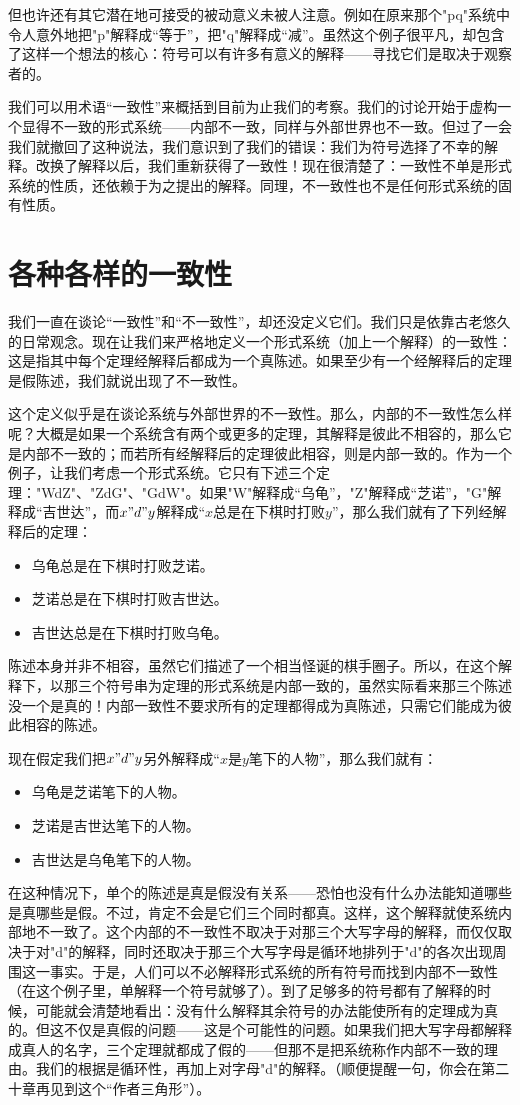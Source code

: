 但也许还有其它潜在地可接受的被动意义未被人注意。例如在原来那个"pq"系统中令人意外地把"p"解释成“等于”，把"q"解释成“减”。虽然这个例子很平凡，却包含了这样一个想法的核心：符号可以有许多有意义的解释——寻找它们是取决于观察者的。

我们可以用术语“一致性”来概括到目前为止我们的考察。我们的讨论开始于虚构一个显得不一致的形式系统——内部不一致，同样与外部世界也不一致。但过了一会我们就撤回了这种说法，我们意识到了我们的错误：我们为符号选择了不幸的解释。改换了解释以后，我们重新获得了一致性！现在很清楚了：一致性不单是形式系统的性质，还依赖于为之提出的解释。同理，不一致性也不是任何形式系统的固有性质。

\section{各种各样的一致性}

我们一直在谈论“一致性”和“不一致性”，却还没定义它们。我们只是依靠古老悠久的日常观念。现在让我们来严格地定义一个形式系统（加上一个解释）的一致性：这是指其中每个定理经解释后都成为一个真陈述。如果至少有一个经解释后的定理是假陈述，我们就说出现了不一致性。

这个定义似乎是在谈论系统与外部世界的不一致性。那么，内部的不一致性怎么样呢？大概是如果一个系统含有两个或更多的定理，其解释是彼此不相容的，那么它是内部不一致的；而若所有经解释后的定理彼此相容，则是内部一致的。作为一个例子，让我们考虑一个形式系统。它只有下述三个定理："WdZ"、"ZdG"、"GdW"。如果"W"解释成“乌龟”，"Z"解释成“芝诺”，"G"解释成“吉世达”，而$x"d"y$解释成“$x$总是在下棋时打败$y$”，那么我们就有了下列经解释后的定理：
\begin{itemize}
\item 乌龟总是在下棋时打败芝诺。
\item 芝诺总是在下棋时打败吉世达。
\item 吉世达总是在下棋时打败乌龟。
\end{itemize}
陈述本身并非不相容，虽然它们描述了一个相当怪诞的棋手圈子。所以，在这个解释下，以那三个符号串为定理的形式系统是内部一致的，虽然实际看来那三个陈述没一个是真的！内部一致性不要求所有的定理都得成为真陈述，只需它们能成为彼此相容的陈述。

现在假定我们把$x"d"y$另外解释成“$x$是$y$笔下的人物”，那么我们就有：
\begin{itemize}
\item 乌龟是芝诺笔下的人物。
\item 芝诺是吉世达笔下的人物。
\item 吉世达是乌龟笔下的人物。
\end{itemize}
在这种情况下，单个的陈述是真是假没有关系——恐怕也没有什么办法能知道哪些是真哪些是假。不过，肯定不会是它们三个同时都真。这样，这个解释就使系统内部地不一致了。这个内部的不一致性不取决于对那三个大写字母的解释，而仅仅取决于对"d"的解释，同时还取决于那三个大写字母是循环地排列于"d"的各次出现周围这一事实。于是，人们可以不必解释形式系统的所有符号而找到内部不一致性（在这个例子里，单解释一个符号就够了）。到了足够多的符号都有了解释的时候，可能就会清楚地看出：没有什么解释其余符号的办法能使所有的定理成为真的。但这不仅是真假的问题——这是个可能性的问题。如果我们把大写字母都解释成真人的名字，三个定理就都成了假的——但那不是把系统称作内部不一致的理由。我们的根据是循环性，再加上对字母"d"的解释。（顺便提醒一句，你会在第二十章再见到这个“作者三角形”）。

